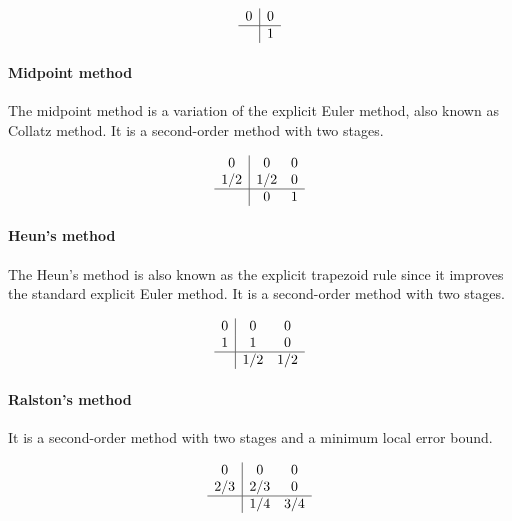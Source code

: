 \begin{equation}
	\begin{array}{c|c}
		0 & 0 \\ \hline
		  & 1  
	\end{array}
	\label{eq::explicit_euler}
\end{equation}

\paragraph{Midpoint method}
The midpoint method is a variation of the explicit Euler method, also known as Collatz method. It is a second-order method with two stages.

\begin{equation}
	\begin{array}{c|cc}
		0   & 0   & 0 \\
		1/2 & 1/2 & 0 \\ \hline
		    & 0   & 1 
	\end{array}
	\label{eq::midpoint}
\end{equation}

\paragraph{Heun's method}
The Heun's method is also known as the explicit trapezoid rule since it improves the standard explicit Euler method. It is a second-order method with two stages.

\begin{equation}
	\begin{array}{c|cc}
		0      & 0   & 0 \\
		1      & 1   & 0 \\ \hline
		       & 1/2  & 1/2
	\end{array}
	\label{eq::heun}
\end{equation}

\paragraph{Ralston's method}
It is a second-order method with two stages and a minimum local error bound.

\begin{equation}
	\begin{array}{c|cc}
		0      & 0   & 0 \\
		2/3    & 2/3 & 0 \\ \hline
		       & 1/4 & 3/4
	\end{array}
	\label{eq::ralston}
\end{equation}

